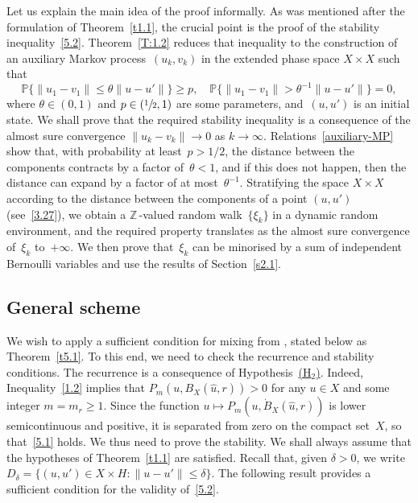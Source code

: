 \documentclass[JEP,XML,SOM,Unicode,ThmDefs]{cedram}
\theoremstyle{plain}
\numberwithin{equation}{section}
\newcommand{\Z}{{\mathbb Z}}
\newcommand{\IP}{{\mathbb P}}
\begin{document}
Let us explain the main idea of the proof informally. As was mentioned after the formulation of Theorem~\ref{t1.1}, the crucial point is the proof of the stability inequality~\eqref{5.2}. Theorem~\ref{T:1.2} reduces that inequality to the construction of an auxiliary Markov process~$(u_k,v_k)$ in the extended phase space $X\times X$ such that\vspace*{-3pt}
\begin{equation} \label{auxiliary-MP}
\IP\{\|u_1-v_1\|\le \theta\|u-u'\|\}\ge p,\quad \IP\{\|u_1-v_1\|> \theta^{-1}\|u-u'\|\}=0,
\end{equation}
where $\theta\in(0,1)$ and $p\in(\sfrac12,1)$ are some parameters, and~$(u,u')$ is an initial state. We shall prove that the required stability inequality is a consequence of the almost sure convergence $\|u_k-v_k\|\to0$ as $k\to\infty$. Relations~\eqref{auxiliary-MP} show that, with probability at least~$p>1/2$, the distance between the components contracts by a factor of~$\theta<1$, and if this does not happen, then the distance can expand by a factor of at most~$\theta^{-1}$. Stratifying the space $X\times X$ according to the distance between the components of a point $(u,u')$ (see~\eqref{3.27}), we obtain a $\Z\,$-valued random walk~$\{\xi_k\}$ in a dynamic random environment, and the required property translates as the almost sure convergence of~$\xi_k$ to~$+\infty$. We then prove that~$\xi_k$ can be minorised by a sum of independent Bernoulli variables and use the results of Section~\ref{s2.1}.

\subsection{General scheme}
\label{s3.1}
We wish to apply a sufficient condition for mixing from \cite[\S 3.1.2]{KS-book}, stated below as Theorem~\ref{t5.1}. To this end, we need to check the recurrence and stability conditions. The recurrence is a consequence of Hypothesis~\hyperlink{H1}{(H$_2$)}. \hbox{Indeed}, Inequality~\eqref{1.2} implies that $P_m(u,B_X(\hat u,r))>0$ for any $u\in X$ and some integer $m=m_r\ge1$. Since the function $u\mapsto P_m(u,\dot B_X(\hat u,r))$ is lower semicontinuous and positive, it is separated from zero on the compact set~$X$, so that~\eqref{5.1} holds. We thus need to prove the stability. We shall always assume that the hypotheses of Theorem~\ref{t1.1} are satisfied. Recall that, given $\delta>0$, we write $D_\delta=\{(u,u')\in X\times H:\|u-u'\|\le\delta\}$. The following result provides a sufficient condition for the validity of~\eqref{5.2}.
\end{document}
